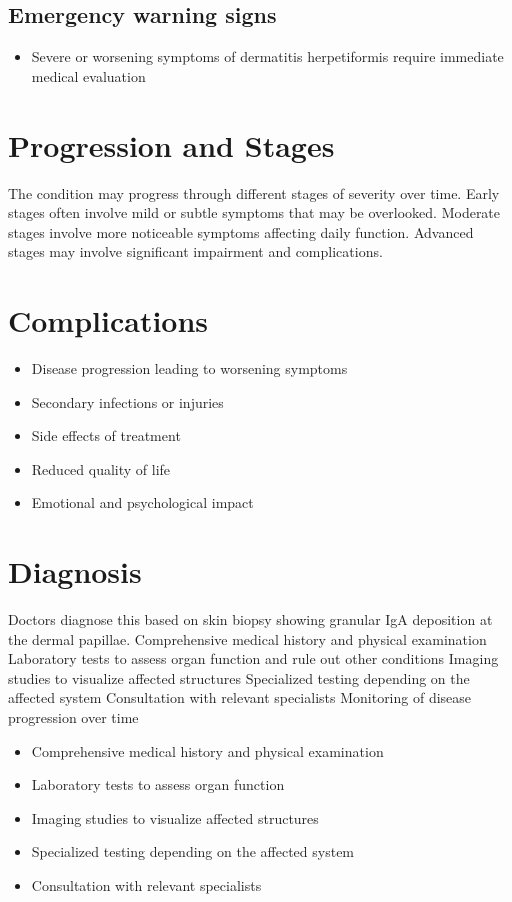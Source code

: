 \subsection{Emergency warning signs}
\begin{itemize}[noitemsep]
  \item Severe or worsening symptoms of dermatitis herpetiformis require immediate medical evaluation
\end{itemize}
\section{Progression and Stages}
The condition may progress through different stages of severity over time. Early stages often involve mild or subtle symptoms that may be overlooked. Moderate stages involve more noticeable symptoms affecting daily function. Advanced stages may involve significant impairment and complications.
\section{Complications}
\begin{itemize}[noitemsep]
  \item Disease progression leading to worsening symptoms
  \item Secondary infections or injuries
  \item Side effects of treatment
  \item Reduced quality of life
  \item Emotional and psychological impact
\end{itemize}
\section{Diagnosis}
Doctors diagnose this based on skin biopsy showing granular IgA deposition at the dermal papillae. Comprehensive medical history and physical examination Laboratory tests to assess organ function and rule out other conditions Imaging studies to visualize affected structures Specialized testing depending on the affected system Consultation with relevant specialists Monitoring of disease progression over time

\begin{itemize}[noitemsep]
  \item Comprehensive medical history and physical examination
  \item Laboratory tests to assess organ function
  \item Imaging studies to visualize affected structures
  \item Specialized testing depending on the affected system
  \item Consultation with relevant specialists
\end{itemize}
